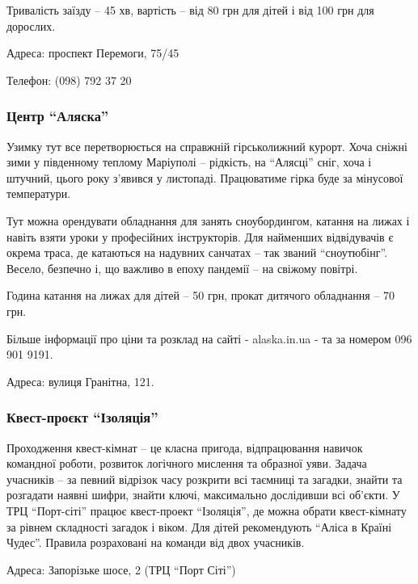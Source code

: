 Тривалість заїзду – 45 хв, вартість – від 80 грн для дітей і від 100 грн для
дорослих.

Адреса: проспект Перемоги, 75/45

Телефон: (098) 792 37 20


\subsubsection{Центр \enquote{Аляска}}

Узимку тут все перетворюється на справжній гірськолижний курорт. Хоча сніжні
зими у південному теплому Маріуполі – рідкість, на \enquote{Алясці} сніг, хоча і
штучний, цього року з'явився у листопаді. Працюватиме гірка буде за мінусової
температури.

Тут можна орендувати обладнання для занять сноубордингом, катання на лижах і
навіть взяти уроки у професійних інструкторів. Для найменших відвідувачів є
окрема траса, де катаються на надувних санчатах – так званий \enquote{сноутюбінг}.
Весело, безпечно і, що важливо в епоху пандемії – на свіжому повітрі.

Година катання на лижах для дітей – 50 грн, прокат дитячого обладнання – 70
грн.

Більше інформації про ціни та розклад на сайті - alaska.in.ua - та за номером 096 901 9191.

Адреса: вулиця Гранітна, 121.


\subsubsection{Квест-проєкт \enquote{Ізоляція}}

Проходження квест-кімнат – це класна пригода, відпрацювання навичок командної
роботи, розвиток логічного мислення та образної уяви. Задача учасників – за
певний відрізок часу розкрити всі таємниці та загадки, знайти та розгадати
наявні шифри, знайти ключі, максимально дослідивши всі об'єкти. У ТРЦ
\enquote{Порт-сіті} працює квест-проект \enquote{Ізоляція}, де можна обрати квест-кімнату за
рівнем складності загадок і віком. Для дітей рекомендують \enquote{Аліса в Країні
Чудес}. Правила розраховані на команди від двох учасників.

Адреса: Запорізьке шосе, 2 (ТРЦ \enquote{Порт Сіті})

